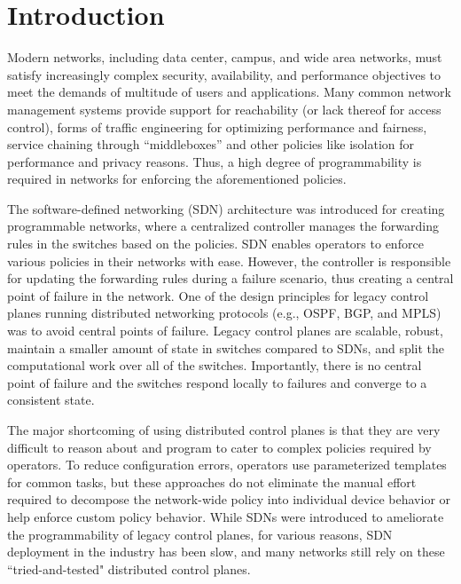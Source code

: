 \section{Introduction}
Modern networks, including data center, campus, 
and wide area networks, 
must satisfy increasingly complex security, 
availability, and performance objectives to 
meet the demands of multitude of users and applications. 
Many common network management systems provide support
for reachability (or lack thereof for access control),
forms of traffic engineering for optimizing performance
and fairness, service chaining through ``middleboxes'' and
other policies like isolation for performance and privacy reasons.
Thus, a high degree of programmability is required in networks
for enforcing the aforementioned policies.

The software-defined networking (SDN) architecture was introduced
for creating programmable networks, where a centralized controller
manages the forwarding rules in the switches based on the policies.
SDN enables operators to enforce various policies in their networks 
with ease. 
However, the controller is responsible for updating the forwarding
rules during a failure scenario, thus creating a central point of 
failure in the network. One of the design principles
for legacy control planes running distributed networking protocols 
(e.g., OSPF, BGP, and MPLS) was to avoid central points of failure.
Legacy control planes are scalable, robust, maintain a smaller amount 
of state in switches compared to SDNs, 
and split the computational work over all of the switches. 
Importantly, there is no central point of failure and the switches
respond locally to failures and converge to a consistent state. 

The major shortcoming of using distributed control planes is that
they are very difficult to reason about and program to cater to 
complex policies required by operators. To reduce configuration 
errors, operators use parameterized templates for common
tasks, but these approaches do not eliminate the manual effort
required to decompose the network-wide policy into individual device
behavior or help enforce custom policy behavior. While SDNs 
were introduced to ameliorate the programmability of legacy control planes, 
for various reasons, 
SDN deployment in the industry has been slow, and many 
networks still rely on these ``tried-and-tested" distributed 
control planes. 


